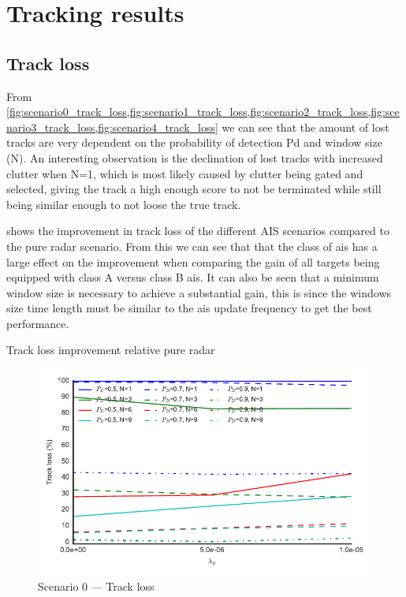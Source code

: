 \section{Tracking results}
\subsection{Track loss}
From \cref{fig:scenario0_track_loss,fig:scenario1_track_loss,fig:scenario2_track_loss,fig:scenario3_track_loss,fig:scenario4_track_loss} we can see that the amount of lost tracks are very dependent on the probability of detection \gls{Pd} and window size (N). An interesting observation is the declination of lost tracks with increased clutter when N=1, which is most likely caused by clutter being gated and selected, giving the track a high enough score to not be terminated while still being similar enough to not loose the true track.

 shows the improvement in track loss of the different AIS scenarios compared to the pure radar scenario. From this we can see that that the class of \gls{ais} has a large effect on the improvement when comparing the gain of all targets being equipped with class A versus class B \gls{ais}. It can also be seen that a minimum window size is necessary to achieve a substantial gain, this is since the windows size time length must be similar to the \gls{ais} update frequency to get the best performance.

\begin{table}[H]
\centering
{}
\caption{Track loss improvement relative pure radar}\label{tab:track_loss_improvement}
\end{table}

\begin{figure}
\centering
\includegraphics{Figures/plots/Scenario0_Tracking-TrackLoss.pdf}
\caption{Scenario 0 --- Track loss}\label{fig:scenario0_track_loss}
\end{figure}

